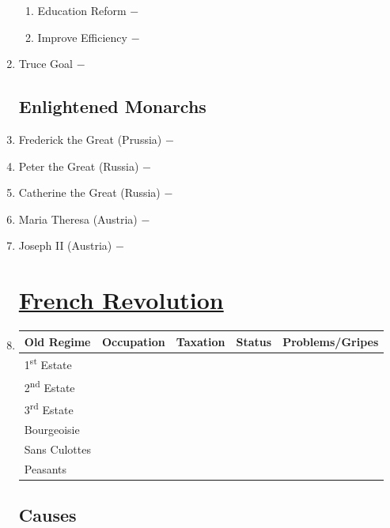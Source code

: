 \documentclass[12pt]{article}
\begin{document}
\begin{enumerate}
\begin{enumerate}[label=\arabic{*}.]
\item Education Reform $-$ 

\item Improve Efficiency $-$ 


\end{enumerate}
\setcounter{enumi}{283}

\item Truce Goal $-$

\subsection{Enlightened Monarchs}

\item Frederick the Great (Prussia) $-$ 

\item Peter the Great (Russia) $-$

\item Catherine the Great (Russia) $-$ 

\item Maria Theresa (Austria) $-$ 

\item Joseph II (Austria) $-$


\section{\underline{French Revolution}} 

\item \begin{tabular}{l c c c c}

Old Regime & Occupation & Taxation & Status & Problems/Gripes\\
\hline
1\textsuperscript{st} Estate & & & & \\
\hline
2\textsuperscript{nd} Estate & & & & \\
\hline
3\textsuperscript{rd} Estate & & & & \\
\hline
Bourgeoisie & & & & \\
\hline
Sans Culottes & & & & \\
\hline
Peasants & & & & \\
\hline

\end{tabular}

\subsection{Causes}


\end{enumerate}
\end{document}
